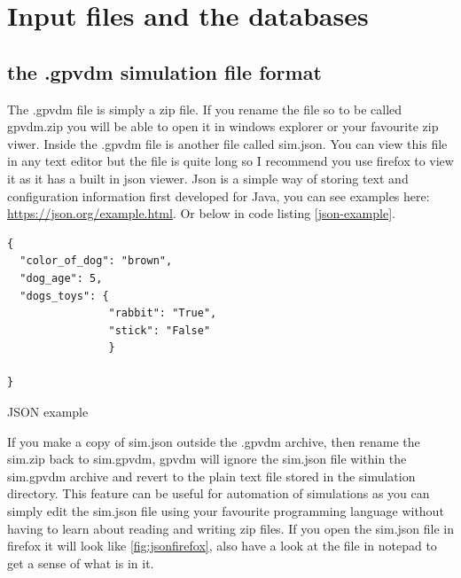 \newpage
\section{Input files and the databases}

\subsection{the .gpvdm simulation file format}
\label{sec:gpvdmfileformat} 
The .gpvdm file is simply a zip file. If you rename the file so to be called gpvdm.zip you will be able to open it in windows explorer or your favourite zip viwer.  Inside the .gpvdm file is another file called sim.json. You can view this file in any text editor but the file is quite long so I recommend you use firefox to view it as it has a built in json viewer.  Json is a simple way of storing text and configuration information first developed for Java, you can see examples here: \url{https://json.org/example.html}. Or below in code listing \ref{json-example}.

\begin{listing}
\begin{verbatim}
{
  "color_of_dog": "brown",
  "dog_age": 5,
  "dogs_toys": {
				"rabbit": "True",
				"stick": "False"
				}

}
\end{verbatim}
\caption{JSON example} 
\label{json-example}
\end{listing}


If you make a copy of sim.json outside the .gpvdm archive, then rename the sim.zip back to sim.gpvdm, gpvdm will ignore the sim.json file within the sim.gpvdm archive and revert to the plain text file stored in the simulation directory.  This feature can be useful for automation of simulations as you can simply edit the sim.json file using your favourite programming language without having to learn about reading and writing zip files. If you open the sim.json file in firefox it will look like \ref{fig:jsonfirefox}, also have a look at the file in notepad to get a sense of what is in it.

